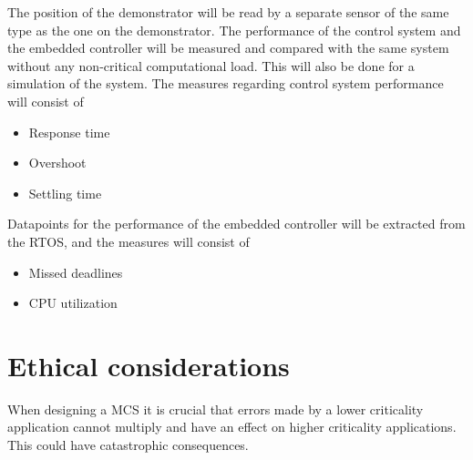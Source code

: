 The position of the demonstrator will be read by a separate sensor of the same type as the one on the demonstrator. The performance of the control system and the embedded controller will be measured and compared with the same system without any non-critical computational load. This will also be done for a simulation of the system. The measures regarding control system performance will consist of 
\begin{itemize}
\item Response time
\item Overshoot
\item Settling time %
\end{itemize}

Datapoints for the performance of the embedded controller will be extracted from the RTOS, and the measures will consist of
\begin{itemize}
\item Missed deadlines
\item CPU utilization
\end{itemize}

\section{Ethical considerations}
When designing a MCS it is crucial that errors made by a lower criticality application cannot multiply and have an effect on higher criticality applications. This could have catastrophic consequences.